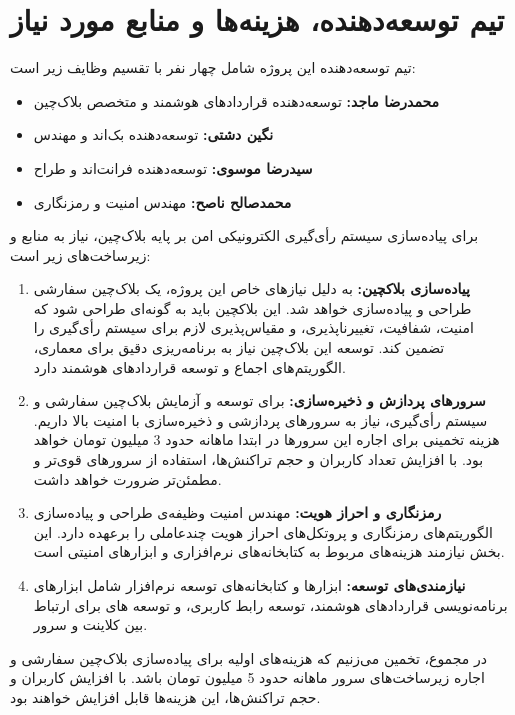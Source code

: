 \documentclass[12pt]{article}
\begin{document}
\section{تیم توسعه‌دهنده، هزینه‌ها و منابع مورد نیاز}
تیم توسعه‌دهنده این پروژه شامل چهار نفر با تقسیم وظایف زیر است:
\begin{itemize}
\item
\textbf{محمدرضا ماجد:} 
توسعه‌دهنده قراردادهای هوشمند و متخصص بلاک‌چین
\item
\textbf{نگین دشتی:} 
توسعه‌دهنده بک‌اند و مهندس 
\item
\textbf{سیدرضا موسوی:} 
توسعه‌دهنده فرانت‌اند و طراح 
\item
\textbf{محمدصالح ناصح:} 
مهندس امنیت و رمزنگاری
\end{itemize}	


برای پیاده‌سازی سیستم رأی‌گیری الکترونیکی امن بر پایه بلاک‌چین، نیاز به منابع و زیرساخت‌های زیر است:
\begin{enumerate}[label = (\arabic*), leftmargin = *]
\item
\textbf{پیاده‌سازی بلاکچین:} 
به دلیل نیازهای خاص این پروژه، یک بلاک‌چین سفارشی طراحی و پیاده‌سازی خواهد شد. این بلاکچین باید به گونه‌ای طراحی شود که امنیت، شفافیت، تغییرناپذیری، و مقیاس‌پذیری لازم برای سیستم رأی‌گیری را تضمین کند. توسعه این بلاک‌چین نیاز به برنامه‌ریزی دقیق برای معماری، الگوریتم‌های اجماع و توسعه قراردادهای هوشمند دارد.
\item
\textbf{سرورهای پردازش و ذخیره‌سازی: }
برای توسعه و آزمایش بلاک‌چین سفارشی و سیستم رأی‌گیری، نیاز به سرورهای پردازشی و ذخیره‌سازی با امنیت بالا داریم. هزینه تخمینی برای اجاره این سرورها در ابتدا ماهانه حدود 3 میلیون تومان خواهد بود. با افزایش تعداد کاربران و حجم تراکنش‌ها، استفاده از سرورهای قوی‌تر و مطمئن‌تر ضرورت خواهد داشت.
\item
\textbf{رمزنگاری و احراز هویت: }
مهندس امنیت وظیفه‌ی طراحی و پیاده‌سازی الگوریتم‌های رمزنگاری و پروتکل‌های احراز هویت چندعاملی را برعهده دارد. این بخش نیازمند هزینه‌های مربوط به کتابخانه‌های نرم‌افزاری و ابزارهای امنیتی است.
\item
\textbf{نیازمندی‌های توسعه: }
ابزارها و کتابخانه‌های توسعه نرم‌افزار شامل ابزارهای برنامه‌نویسی قراردادهای هوشمند، توسعه رابط کاربری، و توسعه 
های  
برای ارتباط بین کلاینت و سرور.
\end{enumerate}

در مجموع، تخمین می‌زنیم که هزینه‌های اولیه برای پیاده‌سازی بلاک‌چین سفارشی و اجاره زیرساخت‌های سرور ماهانه حدود 5 میلیون تومان باشد. با افزایش کاربران و حجم تراکنش‌ها، این هزینه‌ها قابل افزایش خواهند بود.
\end{document}
